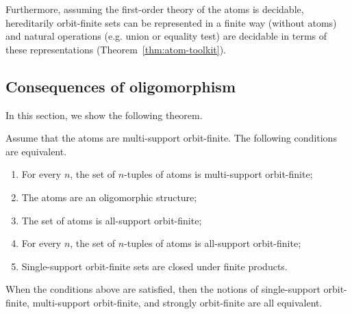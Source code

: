 Furthermore, assuming the first-order theory of the atoms is decidable, hereditarily orbit-finite sets can be represented in a finite way (without atoms) and natural operations (e.g. union or equality test) are decidable in terms of these representations (Theorem~\ref{thm:atom-toolkit}).
 
\subsection{Consequences of oligomorphism}
In this section, we show the following theorem.


\begin{theorem}\label{thm:of-char}
	Assume that the atoms are multi-support orbit-finite.
The following conditions are equivalent.
\begin{enumerate}
	\item \label{it:of-char-ss-tuples} For every $n$, the set of $n$-tuples of atoms is multi-support orbit-finite;
		\item \label{it:of-char-oligomorphic} The atoms are an oligomorphic structure;
	\item \label{it:of-char-strong-atoms} The set of atoms is all-support orbit-finite;
	\item \label{it:of-char-strong-tuples} For every $n$, the set of $n$-tuples of atoms is all-support orbit-finite;
	\item \label{it:of-char-ms-closed-under products} Single-support orbit-finite sets are closed under finite products.
\end{enumerate}
When the conditions above are satisfied, then the notions of single-support orbit-finite, multi-support orbit-finite, and strongly orbit-finite are all equivalent.
\end{theorem}

